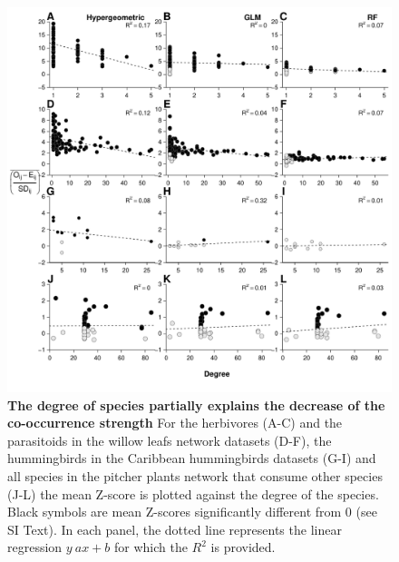 \newpage

\begin{figure}
\centering
\includegraphics{chapitre3/figS7.pdf}
\caption{\textbf{The degree of species partially explains the decrease
of the co-occurrence strength} For the herbivores (A-C) and the
parasitoids in the willow leafs network datasets (D-F), the hummingbirds
in the Caribbean hummingbirds datasets (G-I) and all species in the
pitcher plants network that consume other species (J-L) the mean Z-score
is plotted against the degree of the species. Black symbols are mean
Z-scores significantly different from 0 (see SI Text). In each panel,
the dotted line represents the linear regression \(y~ax+b\) for which
the \(R^2\) is provided.\label{fig:degree}}
\end{figure}

\newpage

